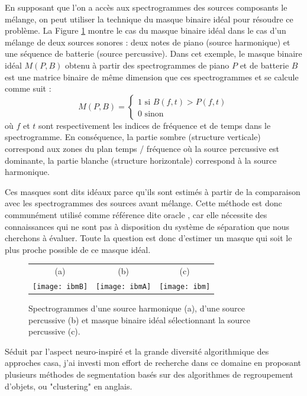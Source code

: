 En supposant que l'on a accès aux spectrogrammes des sources composants le mélange, on peut utiliser la technique du masque binaire idéal pour résoudre ce problème. La Figure \ref{fig:ibm} montre le cas du masque binaire idéal dans le cas d'un mélange de deux sources sonores : deux notes de piano (source harmonique) et une séquence de batterie (source percussive). Dans cet exemple, le masque binaire idéal $M(P, B)$ obtenu à partir des spectrogrammes de piano $P$ et de batterie $B$  est une matrice binaire de même dimension que ces spectrogrammes et se calcule comme suit :
\begin{equation}
M(P, B) =
\begin{cases}
  1 \text{ si } B(f,t)>P(f,t) \\
  0 \text{ sinon}
  \end{cases}
\end{equation}
où $f$ et $t$ sont respectivement les indices de fréquence et de temps dans le spectrogramme. En conséquence, la partie sombre (structure verticale) correspond aux zones du plan temps / fréquence où la source percussive est dominante, la partie blanche (structure horizontale) correspond à la source harmonique.

Ces masques sont dits idéaux parce qu'ils sont estimés à partir de la comparaison avec les spectrogrammes des sources avant mélange. Cette méthode est donc communément utilisé comme référence dite \og oracle \fg, car elle nécessite des connaissances qui ne sont pas à disposition du système de séparation que nous cherchons à évaluer. Toute la question est donc d'estimer un masque qui soit le plus proche possible de ce masque idéal.

\begin{figure}[t]
  \footnotesize
  \begin{tabular}{ccc}
    (a) & (b) & (c)  \\
  \texttt{[image: ibmB]} &
  \texttt{[image: ibmA]} &
  \texttt{[image: ibm]} \\
\end{tabular}
  \caption{Spectrogrammes d'une source harmonique (a), d'une source percussive (b) et masque binaire idéal sélectionnant la source percussive (c).} \label{fig:ibm}
\end{figure}


Séduit par l'aspect neuro-inspiré et la grande diversité algorithmique des approches casa, j'ai investi mon effort de recherche dans ce domaine en proposant plusieurs méthodes de segmentation basés sur des algorithmes de regroupement d'objets, ou "clustering" en anglais.

